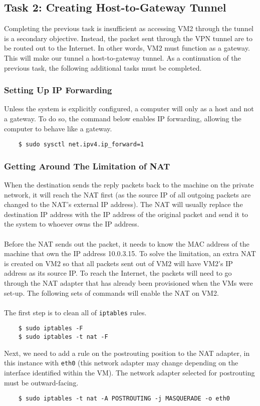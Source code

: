 \documentclass[a4paper,12pt]{article}
\begin{document}
	\subsection{Task 2: Creating Host-to-Gateway Tunnel}
	Completing the previous task is insufficient as accessing VM2 through the tunnel is a secondary objective. Instead, the packet sent through the VPN tunnel are to be routed out to the Internet. In other words, VM2 must function as a gateway. This will make our tunnel a host-to-gateway tunnel. As a continuation of the previous task, the following additional tasks must be completed.
	\subsubsection{Setting Up IP Forwarding}
	Unless the system is explicitly configured, a computer will only as a host and not a gateway. To do so, the command below enables IP forwarding, allowing the computer to behave like a gateway.
	\begin{verbatim}
	$ sudo sysctl net.ipv4.ip_forward=1
	\end{verbatim}
	\subsubsection{Getting Around The Limitation of NAT}
	When the destination sends the reply packets back to the machine on the private network, it will reach the NAT first (as the source IP of all outgoing packets are changed to the NAT's external IP address). The NAT will usually replace the destination IP address with the IP address of the original packet and send it to the system to whoever owns the IP address.\\\\Before the NAT sends out the packet, it needs to know the MAC address of the machine that own the IP address 10.0.3.15. To solve the limitation, an extra NAT is created on VM2 so that all packets sent out of VM2 will have VM2's IP address as its source IP. To reach the Internet, the packets will need to go through the NAT adapter that has already been provisioned when the VMs were set-up. The following sets of commands will enable the NAT on VM2.\\\\The first step is to clean all of \texttt{iptables} rules.
	\begin{verbatim}
	$ sudo iptables -F
	$ sudo iptables -t nat -F
	\end{verbatim}
	Next, we need to add a rule on the postrouting position to the NAT adapter, in this instance with \texttt{eth0} (this network adapter may change depending on the interface identified within the VM). The network adapter selected for postrouting must be outward-facing.
	\begin{verbatim}
	$ sudo iptables -t nat -A POSTROUTING -j MASQUERADE -o eth0
	\end{verbatim}
\end{document}
